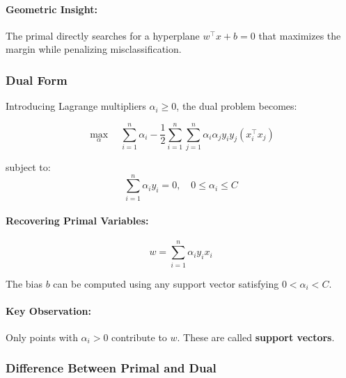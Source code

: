 \documentclass[10pt,a4paper]{article}
\begin{document}
		\paragraph{Geometric Insight:}
		The primal directly searches for a hyperplane $w^\top x + b = 0$ that maximizes the margin while penalizing misclassification.
	
		\vspace{0.5em}
	
		\subsubsection{Dual Form}
	
		Introducing Lagrange multipliers $\alpha_i \geq 0$, the dual problem becomes:
	
		\[
		\max_{\alpha} \quad \sum_{i=1}^{n} \alpha_i
		- \frac{1}{2} \sum_{i=1}^{n} \sum_{j=1}^{n}
		\alpha_i \alpha_j y_i y_j (x_i^\top x_j)
		\]
	
		subject to:
		\[
		\sum_{i=1}^{n} \alpha_i y_i = 0, \quad 0 \leq \alpha_i \leq C
		\]
	
		\paragraph{Recovering Primal Variables:}
		\[
		w = \sum_{i=1}^{n} \alpha_i y_i x_i
		\]
	
		The bias $b$ can be computed using any support vector satisfying $0 < \alpha_i < C$.
	
		\paragraph{Key Observation:}
		Only points with $\alpha_i > 0$ contribute to $w$. These are called \textbf{support vectors}.
	
		\vspace{0.5em}
	
		\subsubsection{Difference Between Primal and Dual}
	
\end{document}
